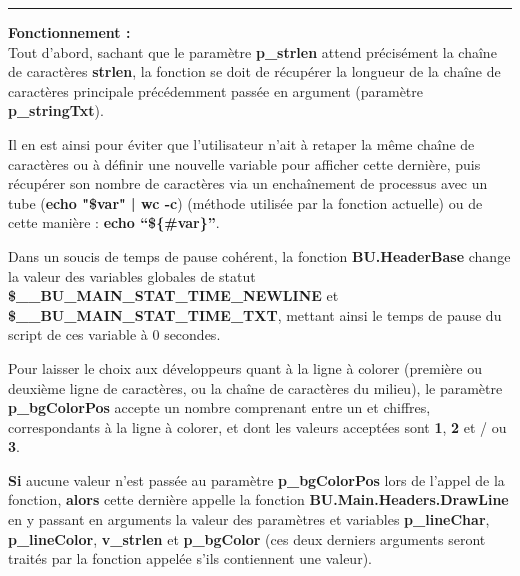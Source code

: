 \documentclass[a4paper,10pt]{article}
\begin{document}
\setlength{\parskip}{2em}
\par\noindent\rule{\textwidth}{0.4pt}\setlength{\parskip}{1em}

\begin{justify}
    \textbf{Fonctionnement :}\\[1\baselineskip]
    Tout d'abord, sachant que le paramètre \textbf{\color{vars}p\_strlen} attend précisément la chaîne de caractères \textbf{strlen}, la fonction se doit de récupérer la longueur de la chaîne de caractères principale précédemment passée en argument (paramètre \textbf{\color{vars}p\_stringTxt}).
\end{justify}

\begin{justify}
    Il en est ainsi pour éviter que l'utilisateur n'ait à retaper la même chaîne de caractères ou à définir une nouvelle variable pour afficher cette dernière, puis récupérer son nombre de caractères via un enchaînement de processus avec un tube (\textbf{\color{cmds}echo \color{vars}"\$var" \color{text} | \color{cmds}wc -c}) (méthode utilisée par la fonction actuelle) ou de cette manière : \textbf{\color{cmds}echo \color{vars}``\$\{\#var\}''}.
\end{justify}

\setlength{\parskip}{2em}


\begin{justify}
    Dans un soucis de temps de pause cohérent, la fonction \textbf{\color{func}BU.HeaderBase} change la valeur des variables globales de statut \textbf{\color{vars}\$\_\_BU\_MAIN\_STAT\_TIME\_NEWLINE} et \textbf{\color{vars}\$\_\_BU\_MAIN\_STAT\_TIME\_TXT}, mettant ainsi le temps de pause du script de ces variable à 0 secondes.\par
\end{justify}

\begin{justify}
    Pour laisser le choix aux développeurs quant à la ligne à colorer (première ou deuxième ligne de caractères, ou la chaîne de caractères du milieu), le paramètre \textbf{\color{vars}p\_bgColorPos} accepte un nombre comprenant entre un et chiffres, correspondants à la ligne à colorer, et dont les valeurs acceptées sont \textbf{1}, \textbf{2} et / ou \textbf{3}.
\end{justify}

\setlength{\parskip}{1em}

\begin{justify}
    \textbf{\color{cond}Si} aucune valeur n'est passée au paramètre \textbf{\color{vars}p\_bgColorPos} lors de l'appel de la fonction, \textbf{\color{cond}alors} cette dernière appelle la fonction \textbf{\color{func}BU.Main.Headers.DrawLine} en y passant en arguments la valeur des paramètres et variables \textbf{\color{vars}p\_lineChar}, \textbf{\color{vars}p\_lineColor}, \textbf{\color{vars}v\_strlen} et \textbf{\color{vars}p\_bgColor} (ces deux derniers arguments seront traités par la fonction appelée s'ils contiennent une valeur).
\end{justify}
\end{document}
